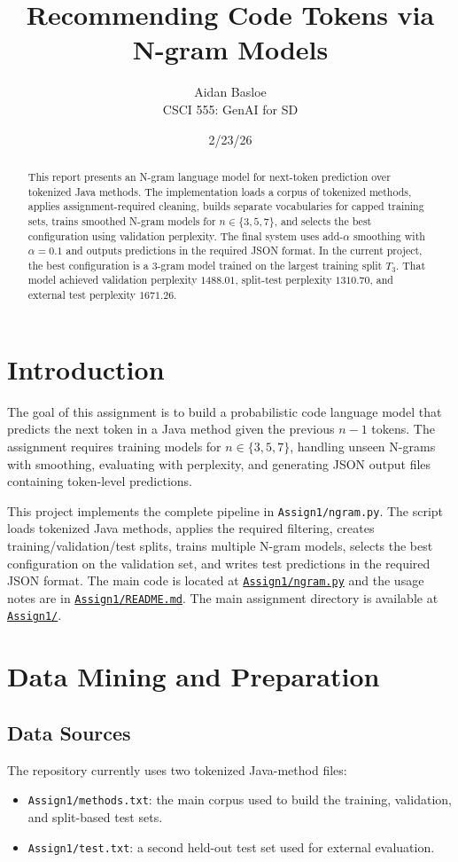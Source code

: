 \documentclass[11pt]{article}
\title{Recommending Code Tokens via N-gram Models}
\author{Aidan Basloe \\ CSCI 555: GenAI for SD}
\date{2/23/26}
\newcommand{\repoURL}{https://github.com/ABasloe/CSCI555}
\begin{document}
\maketitle

\begin{abstract}
This report presents an N-gram language model for next-token prediction over tokenized Java methods. The implementation loads a corpus of tokenized methods, applies assignment-required cleaning, builds separate vocabularies for capped training sets, trains smoothed N-gram models for \(n \in \{3,5,7\}\), and selects the best configuration using validation perplexity. The final system uses add-\(\alpha\) smoothing with \(\alpha = 0.1\) and outputs predictions in the required JSON format. In the current project, the best configuration is a 3-gram model trained on the largest training split \(T_3\). That model achieved validation perplexity \(1488.01\), split-test perplexity \(1310.70\), and external test perplexity \(1671.26\).
\end{abstract}

\section{Introduction}
The goal of this assignment is to build a probabilistic code language model that predicts the next token in a Java method given the previous \(n-1\) tokens. The assignment requires training models for \(n \in \{3,5,7\}\), handling unseen N-grams with smoothing, evaluating with perplexity, and generating JSON output files containing token-level predictions.

This project implements the complete pipeline in \texttt{Assign1/ngram.py}. The script loads tokenized Java methods, applies the required filtering, creates training/validation/test splits, trains multiple N-gram models, selects the best configuration on the validation set, and writes test predictions in the required JSON format. The main code is located at \href{\repoURL/blob/main/Assign1/ngram.py}{\texttt{Assign1/ngram.py}} and the usage notes are in \href{\repoURL/blob/main/Assign1/README.md}{\texttt{Assign1/README.md}}. The main assignment directory is available at \href{\repoURL/tree/main/Assign1}{\texttt{Assign1/}}.

\section{Data Mining and Preparation}

\subsection{Data Sources}
The repository currently uses two tokenized Java-method files:
\begin{itemize}[leftmargin=*]
  \item \texttt{Assign1/methods.txt}: the main corpus used to build the training, validation, and split-based test sets.
  \item \texttt{Assign1/test.txt}: a second held-out test set used for external evaluation.
\end{itemize}
\end{document}
